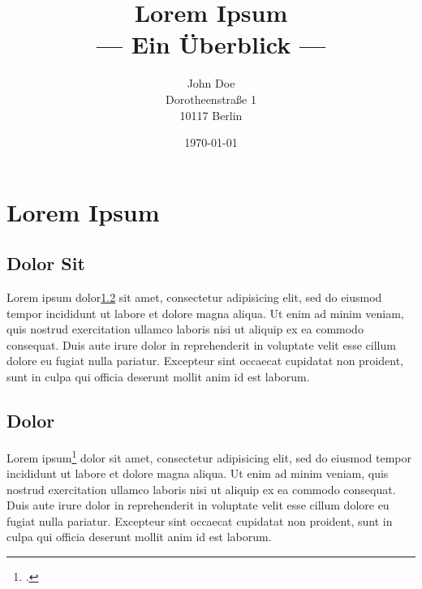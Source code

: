 


\title{\textbf{Lorem Ipsum}\\— Ein Überblick —}
\author{John Doe \\ Dorotheenstraße 1 \\ 10117 Berlin}
\date{\today}



\section{Lorem Ipsum}
\subsection{Dolor Sit}
Lorem ipsum dolor\ref{dolor} sit amet, consectetur adipisicing elit, sed do eiusmod tempor incididunt ut labore et dolore magna aliqua. Ut enim ad minim veniam, quis nostrud exercitation ullamco laboris nisi ut aliquip ex ea commodo consequat. Duis aute irure dolor in reprehenderit in voluptate velit esse cillum dolore eu fugiat nulla pariatur. Excepteur sint occaecat cupidatat non proident, sunt in culpa qui officia deserunt mollit anim id est laborum.

\subsection{Dolor}\label{dolor}
Lorem\cite{knuth2016machine} ipsum\footcite{tkaczyk2015cermine} dolor sit amet, consectetur adipisicing elit, sed do eiusmod tempor incididunt ut labore et dolore magna aliqua. Ut enim ad minim veniam, quis nostrud exercitation ullamco laboris nisi ut aliquip ex ea commodo consequat. Duis aute irure dolor in reprehenderit in voluptate velit esse cillum dolore eu fugiat nulla pariatur. Excepteur sint occaecat cupidatat non proident, sunt in culpa qui officia deserunt mollit anim id est laborum.


